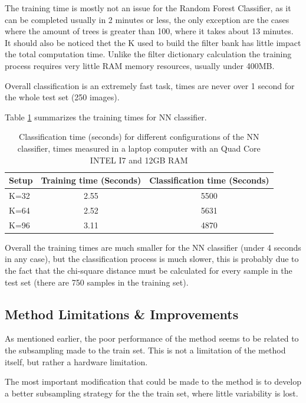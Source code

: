 \documentclass[10pt,twocolumn,letterpaper]{article}
\begin{document}
The training time is mostly not an issue for the Random Forest Classifier, as it can be completed usually in 2 minutes or less, the only exception are the cases where the amount of trees is greater than 100, where it takes about 13 minutes. It should also be noticed thet the K used to build the filter bank has little impact the total computation time. Unlike the filter dictionary calculation the training process requires very little RAM memory resources, usually under 400MB.


Overall classification is an extremely fast task, times are never over 1 second for the whole test set (250 images).


Table \ref{table:timesNN} summarizes the training times for NN classifier.

\begin{table}[ht!]
\centering
\begin{tabular}{ l | c | c  }
Setup & Training time (Seconds) & Classification time (Seconds)    \\
\hline	
K=32 & 2.55& 5500 \\
K=64 & 2.52 & 5631  \\
K=96 & 3.11 &  4870 \\

\end{tabular}
\caption{Classification time (seconds) for different configurations of the NN classifier, times measured in a laptop computer with an Quad Core INTEL I7 and 12GB RAM}
\label{table:timesNN}
\end{table}

Overall the training times are much smaller for the NN classifier (under 4 seconds in any case), but the classification process is much slower, this is probably due to the fact that the chi-square distance must be calculated for every sample in the test set (there are 750 samples in the training set).

\subsection{Method Limitations \& Improvements}
As mentioned earlier, the poor performance of the method seems to be related to the subsampling made to the train set. This is not a limitation of the method itself, but rather a hardware limitation.

The most important modification that could be made to the method is to develop a better  subsampling strategy for the the train set, where little  variability is lost.
\end{document}
